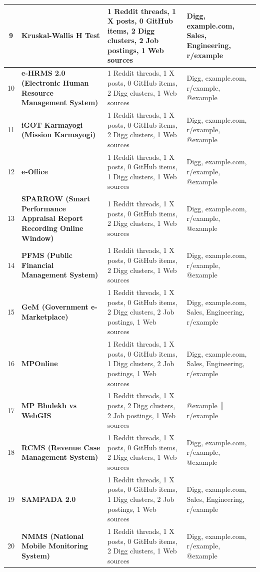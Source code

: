 \documentclass[11pt,a4paper]{article}
\begin{document}
\begin{longtable}{c p{5.8cm} p{5.5cm} p{4.2cm}}
9 & \textbf{Kruskal-Wallis H Test} & 1 Reddit threads, 1 X posts, 0 GitHub items, 2 Digg clusters, 2 Job postings, 1 Web sources & Digg, example.com, Sales, Engineering, r/example \\ \hline
10 & \textbf{e-HRMS 2.0 (Electronic Human Resource Management System)} & 1 Reddit threads, 1 X posts, 0 GitHub items, 2 Digg clusters, 1 Web sources & Digg, example.com, r/example, @example \\ \hline
11 & \textbf{iGOT Karmayogi (Mission Karmayogi)} & 1 Reddit threads, 1 X posts, 0 GitHub items, 2 Digg clusters, 1 Web sources & Digg, example.com, r/example, @example \\ \hline
12 & \textbf{e-Office} & 1 Reddit threads, 1 X posts, 0 GitHub items, 1 Digg clusters, 1 Web sources & Digg, example.com, r/example, @example \\ \hline
13 & \textbf{SPARROW (Smart Performance Appraisal Report Recording Online Window)} & 1 Reddit threads, 1 X posts, 0 GitHub items, 2 Digg clusters, 1 Web sources & Digg, example.com, r/example, @example \\ \hline
14 & \textbf{PFMS (Public Financial Management System)} & 1 Reddit threads, 1 X posts, 0 GitHub items, 2 Digg clusters, 1 Web sources & Digg, example.com, r/example, @example \\ \hline
15 & \textbf{GeM (Government e-Marketplace)} & 1 Reddit threads, 1 X posts, 0 GitHub items, 2 Digg clusters, 2 Job postings, 1 Web sources & Digg, example.com, Sales, Engineering, r/example \\ \hline
16 & \textbf{MPOnline} & 1 Reddit threads, 1 X posts, 0 GitHub items, 1 Digg clusters, 2 Job postings, 1 Web sources & Digg, example.com, Sales, Engineering, r/example \\ \hline
17 & \textbf{MP Bhulekh vs WebGIS} & 1 Reddit threads, 1 X posts, 2 Digg clusters, 2 Job postings, 1 Web sources & @example │ r/example \\ \hline
18 & \textbf{RCMS (Revenue Case Management System)} & 1 Reddit threads, 1 X posts, 0 GitHub items, 2 Digg clusters, 1 Web sources & Digg, example.com, r/example, @example \\ \hline
19 & \textbf{SAMPADA 2.0} & 1 Reddit threads, 1 X posts, 0 GitHub items, 1 Digg clusters, 2 Job postings, 1 Web sources & Digg, example.com, Sales, Engineering, r/example \\ \hline
20 & \textbf{NMMS (National Mobile Monitoring System)} & 1 Reddit threads, 1 X posts, 0 GitHub items, 2 Digg clusters, 1 Web sources & Digg, example.com, r/example, @example \\ \hline

\end{longtable}
\end{document}
